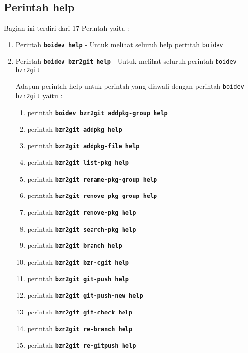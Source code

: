 \subsection{Perintah help}
\noindent
Bagian ini terdiri dari 17 Perintah yaitu :
\begin{enumerate}
	\item Perintah \texttt{\textbf{boidev help}} - Untuk melihat seluruh help perintah \texttt{boidev}
	
	\item Perintah \texttt{\textbf{boidev bzr2git help}} - Untuk melihat seluruh perintah \texttt{boidev bzr2git}
	
	Adapun perintah help untuk perintah yang diawali dengan perintah \texttt{boidev bzr2git} yaitu :
	\begin{enumerate}
        \item perintah \texttt{\textbf{boidev bzr2git addpkg-group help}}
        \item perintah \texttt{\textbf{bzr2git addpkg help}}
        \item perintah \texttt{\textbf{bzr2git addpkg-file help}}
        \item perintah \texttt{\textbf{bzr2git list-pkg help}}
        \item perintah \texttt{\textbf{bzr2git rename-pkg-group help}}
        \item perintah \texttt{\textbf{bzr2git remove-pkg-group help}}
        \item perintah \texttt{\textbf{bzr2git remove-pkg help}}
        \item perintah \texttt{\textbf{bzr2git search-pkg help}}
        \item perintah \texttt{\textbf{bzr2git branch help}}
        \item perintah \texttt{\textbf{bzr2git bzr-cgit help}}
        \item perintah \texttt{\textbf{bzr2git git-push help}}
        \item perintah \texttt{\textbf{bzr2git git-push-new help}}
        \item perintah \texttt{\textbf{bzr2git git-check help}}
        \item perintah \texttt{\textbf{bzr2git re-branch help}}
        \item perintah \texttt{\textbf{bzr2git re-gitpush help}}
	\end{enumerate}
\end{enumerate}